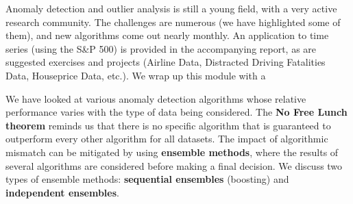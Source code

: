 \documentclass[20pt,landscape,footrule,headrule]{foils}
\newcommand{\newl}{\newline\newline}
\def\fh{\foilhead}
\begin{document}
{{%
















\fh{\textcolor{darkestgreen}{6.5 -- Advanced Topics}} \label{6.5}
\noindent Anomaly detection and outlier analysis is still a young field, with a very active research community. \newl The challenges are numerous (we have highlighted some of them), and new algorithms come out nearly monthly. \newl An application to time series (using the S\&P 500) is provided in the accompanying report, as are suggested exercises and projects (Airline Data, Distracted Driving Fatalities Data, Houseprice Data, etc.). \newl We wrap up this module with a 


\fh{6.5.1 -- Outlier Ensembles} \label{6.5.1}
\noindent We have looked at various anomaly detection algorithms whose relative performance varies with the type of data being considered. 
\newl The  \textbf{No Free Lunch theorem} reminds us that there is no specific algorithm that is guaranteed to outperform every other algorithm for all datasets. \newl The impact of algorithmic mismatch can be mitigated by using \textbf{ensemble methods}, where the results of several algorithms are considered before making a final decision. \newl We discuss two types of ensemble methods:  \textbf{sequential ensembles} (boosting) and \textbf{independent ensembles}.

}}
\end{document}
